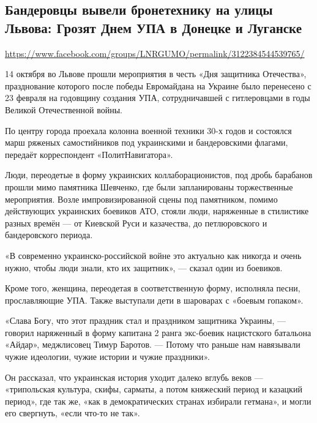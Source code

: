  
 

\subsection{Бандеровцы вывели бронетехнику на улицы Львова: Грозят Днем УПА в Донецке и Луганске }
\label{sec:15_10_2020.fb.lnr.1}

\url{https://www.facebook.com/groups/LNRGUMO/permalink/3122384544539765/}

14 октября во Львове прошли мероприятия в честь «Дня защитника Отечества»,
празднование которого после победы Евромайдана на Украине было перенесено с 23
февраля на годовщину создания УПА, сотрудничавшей с гитлеровцами в годы Великой
Отечественной войны.

По центру города проехала колонна военной техники 30-х годов и состоялся марш
ряженых самостийников под украинскими и бандеровскими флагами, передаёт
корреспондент «ПолитНавигатора».  

Люди, переодетые в форму украинских
коллаборационистов, под дробь барабанов прошли мимо памятника Шевченко, где
были запланированы торжественные мероприятия. Возле импровизированной сцены под
памятником, помимо действующих украинских боевиков АТО, стояли люди, наряженные
в стилистике разных времён --- от Киевской Руси и казачества, до петлюровского и
бандеровского периода.

«В современно украинско-российской войне это актуально как никогда и очень
нужно, чтобы люди знали, кто их защитник», --- сказал один из боевиков.

Кроме того, женщина, переодетая в соответственную форму, исполняла песни,
прославляющие УПА. Также выступали дети в шароварах с «боевым гопаком».

«Слава Богу, что этот праздник стал и праздником защитника Украины, --- говорил
наряженный в форму капитана 2 ранга экс-боевик нацистского батальона «Айдар»,
меджлисовец Тимур Баротов. --- Потому что раньше нам навязывали чужие идеологии,
чужие истории и чужие праздники».

Он рассказал, что украинская история уходит далеко вглубь веков --- «трипольская
культура, скифы, сарматы, а потом княжеский период и казацкий период», где так
же, «как в демократических странах избирали гетмана», и могли его свергнуть,
«если что-то не так».

